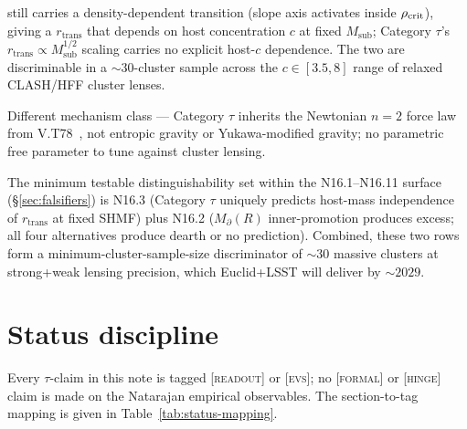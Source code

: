 \documentclass{pantarhei-researchnote}
\newcommand{\Mpa}{M_{\partial}}                 %
\newcommand{\Msub}{M_{\mathrm{sub}}}
\newcommand{\rtran}{r_{\mathrm{trans}}}
\newcommand{\readout}{\textsc{[readout]}}
\newcommand{\evstag}{\textsc{[evs]}}
\newcommand{\falsifierID}[1]{\textsc{N16.#1}}
\begin{document}
\begin{description}[leftmargin=1.7em,itemsep=0.3em]
still carries a density-dependent transition (slope axis activates
inside $\rho_{\rm crit}$), giving a $\rtran$ that depends on host
concentration $c$ at fixed $\Msub$; Category $\tau$'s $\rtran \propto
\Msub^{1/2}$ scaling carries no explicit host-$c$ dependence. The two
are discriminable in a $\sim 30$-cluster sample across the
$c \in [3.5, 8]$ range of relaxed CLASH/HFF cluster lenses.
\item[Verlinde / MOG.] Different mechanism class --- Category $\tau$
inherits the Newtonian $n = 2$ force law from V.T78~\cite{KSZCategorical},
not entropic gravity or Yukawa-modified gravity; no parametric
free parameter to tune against cluster lensing.
\end{description}

\noindent
The minimum testable distinguishability set within the
\falsifierID{1}--\falsifierID{11} surface (\S\ref{sec:falsifiers}) is
\falsifierID{3} (Category $\tau$ uniquely predicts host-mass
independence of $\rtran$ at fixed SHMF) plus \falsifierID{2}
($\Mpa(R)$ inner-promotion produces excess; all four alternatives
produce dearth or no prediction). Combined, these two rows form a
minimum-cluster-sample-size discriminator of $\sim 30$ massive
clusters at strong+weak lensing precision, which Euclid+LSST will
deliver by $\sim 2029$.


\section{Status discipline}\label{sec:status}

Every $\tau$-claim in this note is tagged \readout{} or \evstag{}; no
\textsc{[formal]} or \textsc{[hinge]} claim is made on the Natarajan
empirical observables. The section-to-tag mapping is given in
Table~\ref{tab:status-mapping}.
\end{document}

